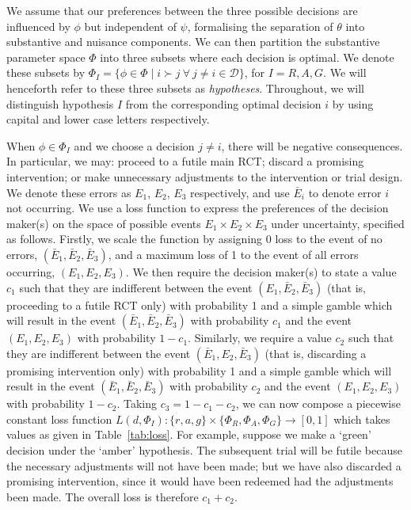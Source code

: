 \documentclass[AMA,STIX1COL]{WileyNJD-v2}
\begin{document}
We assume that our preferences between the three possible decisions are influenced by $\phi$ but independent of $\psi$, formalising the separation of $\theta$ into substantive and nuisance components. We can then partition the substantive parameter space $\Phi$ into three subsets where each decision is optimal. We denote these subsets by $\Phi_{I} = \{ \phi \in \Phi \mid i \succ j ~\forall ~j \neq i \in \mathcal{D} \}$, for $I = R, A, G$. We will henceforth refer to these three subsets as \emph{hypotheses}. Throughout, we will distinguish hypothesis $I$ from the corresponding optimal decision $i$ by using capital and lower case letters respectively.

When $\phi \in \Phi_{I}$ and we choose a decision $j \neq i$, there will be negative consequences. In particular, we may: proceed to a futile main RCT; discard a promising intervention; or make unnecessary adjustments to the intervention or trial design. We denote these errors as $E_1$, $E_2$, $E_3$ respectively, and use $\bar{E}_i$ to denote error $i$ not occurring. We use a loss function to express the preferences of the decision maker(s) on the space of possible events $E_1 \times E_2 \times E_3$ under uncertainty, specified as follows. Firstly, we scale the function by assigning 0 loss to the event of no errors, $(\bar{E}_1, \bar{E}_2, \bar{E}_3)$, and a maximum loss of 1 to the event of all errors occurring, $(E_1, E_2, E_3)$. We then require the decision maker(s) to state a value $c_1$ such that they are indifferent between the event $(E_1, \bar{E}_2, \bar{E}_3)$ (that is, proceeding to a futile RCT only) with probability 1 and a simple gamble which will result in the event $(\bar{E}_1, \bar{E}_2, \bar{E}_3)$ with probability $c_1$ and the event $(E_1, E_2, E_3)$ with probability $1-c_1$. Similarly, we require a value $c_2$ such that they are indifferent between the event $(\bar{E}_1, E_2, \bar{E}_3)$ (that is, discarding a promising intervention only) with probability 1 and a simple gamble which will result in the event $(\bar{E}_1, \bar{E}_2, \bar{E}_3)$ with probability $c_2$ and the event $(E_1, E_2, E_3)$ with probability $1-c_2$. Taking $c_3 = 1 - c_1 - c_2$, we can now compose a piecewise constant loss function  $L(d, \Phi_{I}): \{r, a, g\} \times \{\Phi_{R}, \Phi_{A}, \Phi_{G}\} \rightarrow [0,1]$ which takes values as given in Table~\ref{tab:loss}. For example, suppose we make a `green' decision under the `amber' hypothesis. The subsequent trial will be futile because the necessary adjustments will not have been made; but we have also discarded a promising intervention, since it would have been redeemed had the adjustments been made. The overall loss is therefore $c_{1} + c_{2}$.
\end{document}
